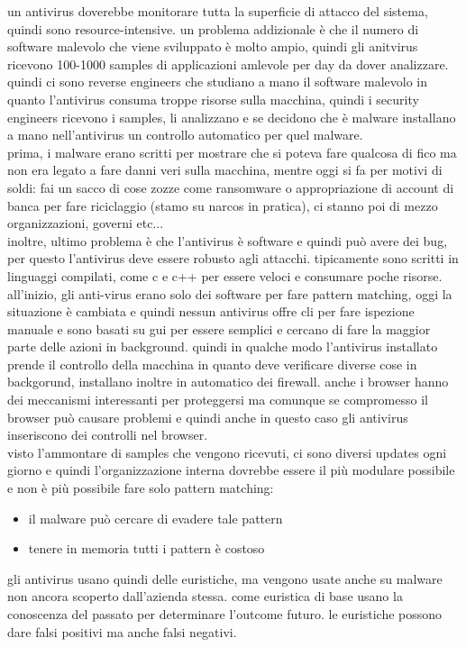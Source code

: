 \documentclass[12pt, oneside]{extbook} %
\begin{document}
un antivirus doverebbe monitorare tutta la superficie di attacco del sistema, quindi sono resource-intensive. un problema addizionale è che il numero di software malevolo che viene sviluppato è molto ampio, quindi gli anitvirus ricevono 100-1000 samples di applicazioni amlevole per day da dover analizzare. quindi ci sono reverse engineers che studiano a mano il software malevolo in quanto l'antivirus consuma troppe risorse sulla macchina, quindi i security engineers  ricevono i samples, li analizzano e se decidono che è malware installano a mano nell'antivirus un controllo automatico per quel malware.\\prima, i malware erano scritti per mostrare che si poteva fare qualcosa di fico ma non era legato a fare danni veri sulla macchina, mentre oggi si fa per motivi di soldi: fai un sacco di cose zozze come ransomware o appropriazione di account di banca per fare riciclaggio (stamo su narcos in pratica), ci stanno poi di mezzo organizzazioni, governi etc...\\inoltre, ultimo problema è che l'antivirus è software e quindi può avere dei bug, per questo l'antivirus deve essere robusto agli attacchi. tipicamente sono scritti in linguaggi compilati, come c e c++ per essere veloci e consumare poche risorse.\\all'inizio, gli anti-virus erano solo dei software per fare pattern matching, oggi la situazione è cambiata e quindi nessun antivirus offre cli per fare ispezione manuale e sono basati su gui per essere semplici e cercano di fare la maggior parte delle azioni in background. quindi in qualche modo l'antivirus installato prende il controllo della macchina in quanto deve verificare diverse cose in backgorund, installano inoltre in automatico dei firewall. anche i browser hanno dei meccanismi interessanti per proteggersi ma comunque se compromesso il browser può causare problemi e quindi anche in questo caso gli antivirus inseriscono dei controlli nel browser.\\ visto l'ammontare di samples che vengono ricevuti, ci sono diversi updates ogni giorno e quindi l'organizzazione interna dovrebbe essere il più modulare possibile e non è più possibile fare solo pattern matching:
\begin{itemize}
\item il malware può cercare di evadere tale pattern
\item tenere in memoria tutti i pattern è costoso
\end{itemize}
gli antivirus usano quindi delle euristiche, ma vengono usate anche su malware non ancora scoperto dall'azienda stessa. come euristica di base usano la conoscenza del passato per determinare l'outcome futuro. le euristiche possono dare falsi positivi ma anche falsi negativi.
\end{document}
